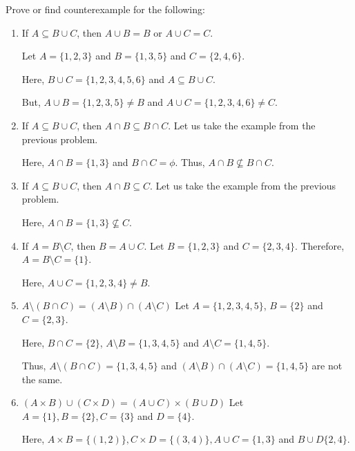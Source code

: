 \bp\label{conjectures}
Prove or find counterexample for the following:
\begin{enumerate}
	\item If $A \subseteq B \cup C$, then $A \cup B = B$ or $A \cup C = C$.

	      \bs
	      Let $A = \{1, 2, 3\}$ and $B = \{ 1, 3, 5 \}$ and $C = \{ 2, 4, 6 \}$.

	      Here, $B \cup C = \{1, 2, 3, 4, 5, 6\}$ and $A \subseteq B \cup C$.

	      But, $A \cup B = \{1, 2, 3, 5\} \neq B$ and $A \cup C = \{1, 2, 3, 4, 6\} \neq C$.
	      \es

	\item If $A \subseteq B \cup C$, then $A \cap B \subseteq B \cap C$.
	      \bs
	      Let us take the example from the previous problem.

	      Here, $A \cap B = \{1, 3\}$ and $B \cap C = \phi$. Thus, $A \cap B \not\subseteq B \cap C$.
	      \es

	\item If $A \subseteq B \cup C$, then $A \cap B \subseteq C$.
	      \bs
	      Let us take the example from the previous problem.

	      Here, $A \cap B = \{1, 3\} \not\subseteq C$.
	      \es


	\item If $A = B \setminus C$, then $B = A \cup C$.
	      \bs
	      Let $B = \{1, 2, 3\}$ and $C = \{2, 3, 4\}$. Therefore, $A = B \setminus C = \{1\}$.

	      Here, $A \cup C = \{1, 2, 3, 4\} \neq B$.
	      \es


	\item $A \setminus (B \cap C) = (A \setminus B) \cap (A \setminus C)$
	      \bs
	      Let $A = \{1, 2, 3, 4, 5\}$, $B = \{2\}$ and $C = \{2, 3\}$.

	      Here, $B \cap C = \{2\}$, $A \setminus B = \{1, 3, 4, 5\}$ and $A \setminus C = \{ 1, 4, 5 \}$.

	      Thus, $A \setminus (B \cap C) = \{1, 3, 4, 5\}$ and $(A \setminus B) \cap (A \setminus C) = \{1, 4, 5\}$ are not the same.
	      \es

	\item $(A \times B) \cup (C \times D) = (A \cup C) \times (B \cup D)$
	      \bs
	      Let $A = \{1\}, B = \{2\}, C = \{3\}$ and $D = \{4\}$.

	      Here, $A \times B = \{(1, 2)\}, C \times D = \{(3,4)\},
		      A \cup C = \{1, 3\}$ and $B \cup D \{2, 4\}$.


\end{enumerate}
